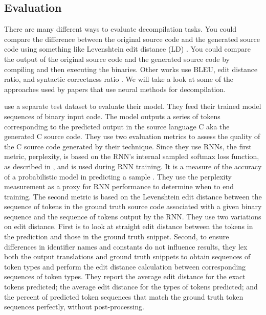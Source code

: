 \documentclass{article}
\begin{document}
\subsection{Evaluation}
There are many different ways to evaluate decompilation tasks. You could compare the difference between the original source code and the generated source code using something like Levenshtein edit distance (LD) \cite{hyyro2001explaining}. You could compare the output of the original source code and the generated source code by compiling and then executing the binaries. Other works use BLEU, edit distance ratio, and syntactic correctness ratio \cite{nguyen2013lexical}. We will take a look at some of the approaches used by papers that use neural methods for decompilation.

\citet{katz2018using} use a separate test dataset to evaluate their model. They feed their trained model sequences of binary input code. The model outputs a series of tokens corresponding to the predicted output in the source language C aka the generated C source code. They use two evaluation metrics to assess the quality of the C source code generated by their technique. Since they use RNNs, the first metric, perplexity, is based on the RNN’s internal sampled softmax loss function, as described in \citet{jean2014using}, and is used during RNN training. It is a measure of the accuracy of a probabilistic model in predicting a sample \cite{shannon2001mathematical}. They use the perplexity measurement as a proxy for RNN performance to determine when to end training. The second metric is
based on the Levenshtein edit distance between the sequence of tokens in the ground truth source code associated with a given binary sequence and the sequence of tokens output by the RNN. They use two variations on edit distance. First is to look at straight edit distance between the tokens in the prediction and those in the ground truth snippet. Second, to ensure differences in identifier names and constants do not influence results, they lex both the output translations and ground truth snippets to obtain sequences of token types and perform the edit distance calculation between corresponding sequences of token types. They report the average edit distance for the exact tokens predicted; the average edit distance for the types of tokens predicted; and the percent of predicted token sequences that match the ground truth token sequences perfectly, without post-processing.
\end{document}

